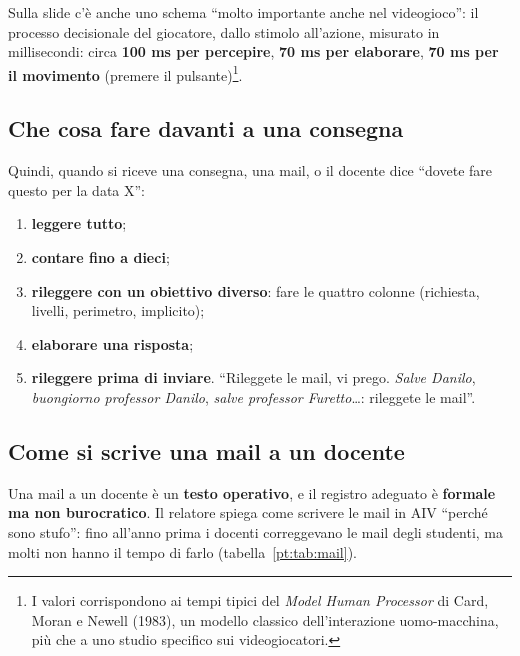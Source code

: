 Sulla slide c'è anche uno schema ``molto importante anche nel videogioco'':
il processo decisionale del giocatore, dallo stimolo all'azione, misurato in
millisecondi: circa \textbf{100 ms per percepire}, \textbf{70 ms per
elaborare}, \textbf{70 ms per il movimento} (premere il pulsante)\footnote{I
valori corrispondono ai tempi tipici del \emph{Model Human Processor} di Card,
Moran e Newell (1983), un modello classico dell'interazione uomo-macchina, più
che a uno studio specifico sui videogiocatori.}.

\subsection{Che cosa fare davanti a una consegna}

Quindi, quando si riceve una consegna, una mail, o il docente dice ``dovete fare
questo per la data X'':
\begin{enumerate}
  \item \textbf{leggere tutto};
  \item \textbf{contare fino a dieci};
  \item \textbf{rileggere con un obiettivo diverso}: fare le quattro colonne
        (richiesta, livelli, perimetro, implicito);
  \item \textbf{elaborare una risposta};
  \item \textbf{rileggere prima di inviare}. ``Rileggete le mail, vi prego.
        \emph{Salve Danilo}, \emph{buongiorno professor Danilo}, \emph{salve
        professor Furetto}\dots: rileggete le mail''.
\end{enumerate}

\subsection{Come si scrive una mail a un docente}

Una mail a un docente è un \textbf{testo operativo}, e il registro adeguato è
\textbf{formale ma non burocratico}. Il relatore spiega come scrivere le mail in
AIV ``perché sono stufo'': fino all'anno prima i docenti correggevano le mail
degli studenti, ma molti non hanno il tempo di farlo (tabella~\ref{pt:tab:mail}).

